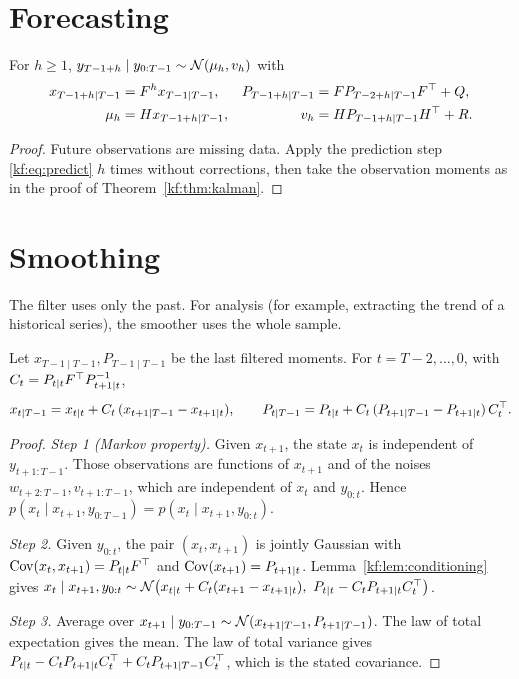 \section{Forecasting}

\begin{proposition}\label{kf:prop:forecast}
For $h\ge1$, $y_{T-1+h}\mid y_{0:T-1}\sim\mathcal{N}(\mu_h,v_h)$ with
\begin{align*}
  x_{T-1+h\mid T-1} &= F^h x_{T-1\mid T-1}, & P_{T-1+h\mid T-1} &= F P_{T-2+h\mid T-1} F^\top + Q,\\
  \mu_h &= Hx_{T-1+h\mid T-1}, & v_h &= HP_{T-1+h\mid T-1}H^\top+R .
\end{align*}
\end{proposition}
\begin{proof}
Future observations are missing data. Apply the prediction step
\eqref{kf:eq:predict} $h$ times without corrections, then take the observation
moments as in the proof of Theorem~\ref{kf:thm:kalman}.
\end{proof}

\section{Smoothing}

The filter uses only the past. For analysis (for example, extracting the trend
of a historical series), the smoother uses the whole sample.

\begin{theorem}\label{kf:thm:rts}
Let $x_{T-1\mid T-1}, P_{T-1\mid T-1}$ be the last filtered moments. For
$t=T-2,\dots,0$, with $C_t = P_{t\mid t}F^\top P_{t+1\mid t}^{-1}$,
\[
  x_{t\mid T-1} = x_{t\mid t} + C_t\,(x_{t+1\mid T-1}-x_{t+1\mid t}),\qquad
  P_{t\mid T-1} = P_{t\mid t} + C_t\,(P_{t+1\mid T-1}-P_{t+1\mid t})\,C_t^\top .
\]
\end{theorem}
\begin{proof}
\emph{Step 1 (Markov property).} Given $x_{t+1}$, the state $x_t$ is
independent of $y_{t+1:T-1}$. Those observations are functions of $x_{t+1}$ and
of the noises $w_{t+2:T-1},v_{t+1:T-1}$, which are independent of $x_t$ and
$y_{0:t}$. Hence $p(x_t\mid x_{t+1},y_{0:T-1})=p(x_t\mid x_{t+1},y_{0:t})$.

\emph{Step 2.} Given $y_{0:t}$, the pair $(x_t,x_{t+1})$ is jointly Gaussian with
$\operatorname{Cov}(x_t,x_{t+1})=P_{t\mid t}F^\top$ and $\operatorname{Cov}(x_{t+1})=P_{t+1\mid t}$.
Lemma~\ref{kf:lem:conditioning} gives
$x_t\mid x_{t+1},y_{0:t}\sim\mathcal{N}\big(x_{t\mid t}+C_t(x_{t+1}-x_{t+1\mid t}),\ P_{t\mid t}-C_tP_{t+1\mid t}C_t^\top\big)$.

\emph{Step 3.} Average over $x_{t+1}\mid y_{0:T-1}\sim\mathcal{N}(x_{t+1\mid T-1},P_{t+1\mid T-1})$.
The law of total expectation gives the mean. The law of total variance gives
$P_{t\mid t}-C_tP_{t+1\mid t}C_t^\top + C_tP_{t+1\mid T-1}C_t^\top$, which is the
stated covariance.
\end{proof}

